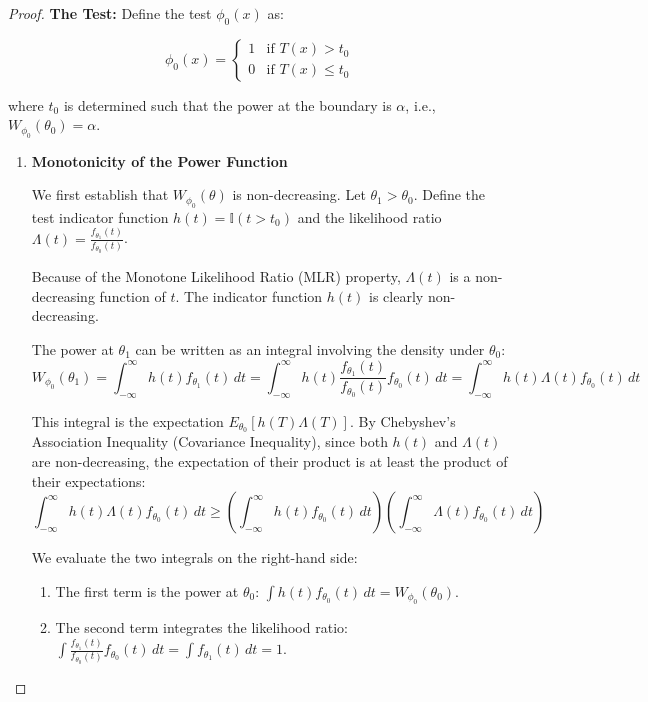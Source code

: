 \documentclass[
  letterpaper,
  DIV=11,
  numbers=noendperiod]{scrreprt}
\providecommand{\tightlist}{%
  \setlength{\itemsep}{0pt}\setlength{\parskip}{0pt}}
\renewcommand{\[}{\begin{equation}}
\renewcommand{\]}{\end{equation}}
\theoremstyle{definition}
\theoremstyle{plain}
\theoremstyle{plain}
\theoremstyle{plain}
\theoremstyle{definition}
\theoremstyle{plain}
\theoremstyle{remark}
\begin{document}
\begin{proof}
\textbf{The Test:} Define the test \(\phi_0(x)\) as:

\[
\phi_0(x) = \begin{cases} 
1 & \text{if } T(x) > t_0 \\
0 & \text{if } T(x) \le t_0
\end{cases}
\]

where \(t_0\) is determined such that the power at the boundary is
\(\alpha\), i.e., \(W_{\phi_0}(\theta_0) = \alpha\).

\begin{enumerate}
\def\labelenumi{\arabic{enumi}.}
\item
  \textbf{Monotonicity of the Power Function}

  We first establish that \(W_{\phi_0}(\theta)\) is non-decreasing. Let
  \(\theta_1 > \theta_0\). Define the test indicator function
  \(h(t) = \mathbb{I}(t > t_0)\) and the likelihood ratio
  \(\Lambda(t) = \frac{f_{\theta_1}(t)}{f_{\theta_0}(t)}\).

  Because of the Monotone Likelihood Ratio (MLR) property,
  \(\Lambda(t)\) is a non-decreasing function of \(t\). The indicator
  function \(h(t)\) is clearly non-decreasing.

  The power at \(\theta_1\) can be written as an integral involving the
  density under \(\theta_0\): \[
  W_{\phi_0}(\theta_1) = \int_{-\infty}^{\infty} h(t) f_{\theta_1}(t) \, dt = \int_{-\infty}^{\infty} h(t) \frac{f_{\theta_1}(t)}{f_{\theta_0}(t)} f_{\theta_0}(t) \, dt = \int_{-\infty}^{\infty} h(t) \Lambda(t) f_{\theta_0}(t) \, dt
  \]

  This integral is the expectation \(E_{\theta_0}[h(T) \Lambda(T)]\). By
  Chebyshev's Association Inequality (Covariance Inequality), since both
  \(h(t)\) and \(\Lambda(t)\) are non-decreasing, the expectation of
  their product is at least the product of their expectations: \[
  \int_{-\infty}^{\infty} h(t) \Lambda(t) f_{\theta_0}(t) \, dt \ge \left( \int_{-\infty}^{\infty} h(t) f_{\theta_0}(t) \, dt \right) \left( \int_{-\infty}^{\infty} \Lambda(t) f_{\theta_0}(t) \, dt \right)
  \]

  We evaluate the two integrals on the right-hand side:

  \begin{enumerate}
  \def\labelenumii{\arabic{enumii}.}
  \tightlist
  \item
    The first term is the power at \(\theta_0\):
    \(\int h(t) f_{\theta_0}(t) \, dt = W_{\phi_0}(\theta_0)\).
  \item
    The second term integrates the likelihood ratio:
    \(\int \frac{f_{\theta_1}(t)}{f_{\theta_0}(t)} f_{\theta_0}(t) \, dt = \int f_{\theta_1}(t) \, dt = 1\).
  \end{enumerate}


\end{enumerate}
\end{proof}
\end{document}
